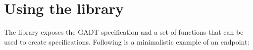 





\section{Using the library}

The library exposes the GADT specification and a set of functions that can be
used to create specifications. Following is a minimalistic example of an
endpoint:\\

